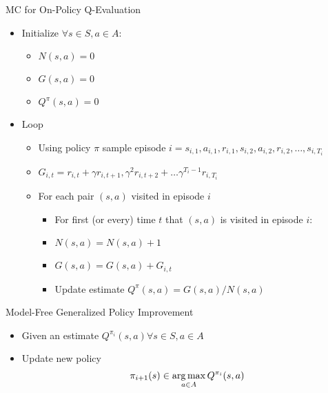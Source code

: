 \documentclass[aspectratio=169]{../latex_main/tntbeamer}  %
\begin{document}
\begin{frame}[c]{MC for On-Policy Q-Evaluation}
	
	\begin{itemize}
		\item Initialize $\forall s\in S, a\in A$:
		\begin{itemize}
			\item $N(s,a) = 0$
			\item $G(s,a) = 0$
			\item $Q^\pi(s,a) =0$
		\end{itemize}
		\item Loop
		\begin{itemize}
			\item Using policy $\pi$ sample episode $i = s_{i,1}, a_{i,1}, r_{i,1}, s_{i,2}, a_{i,2}, r_{i,2}, \ldots, s_{i, T_i}$
			\item $G_{i,t} = r_{i,t} + \gamma r_{i,t+1}, \gamma^2 r_{i,t+2} + \ldots \gamma^{T_i -1} r_{i,T_i}$
			\item For each pair $(s,a)$ visited in episode $i$
			\begin{itemize}
				\item For first (or every) time $t$ that $(s,a)$ is visited in episode $i$:
				\item $N(s,a) = N(s,a) + 1$
				\item $G(s,a) = G(s,a) + G_{i,t}$
				\item Update estimate $Q^\pi(s,a) = G(s,a) /N(s,a)$
			\end{itemize}
		\end{itemize}
	\end{itemize}
	
\end{frame}
\begin{frame}[c]{Model-Free Generalized Policy Improvement}
	
	\begin{itemize}
		\item Given an estimate $Q^{\pi_i}(s,a) \forall s\in S, a \in A$
		\item Update new policy
		$$\pi_{i+1}(s) \in \operatorname*{arg\,max}_{a \in A} Q^{\pi_i} (s,a) $$
	\end{itemize}
	
\end{frame}
\end{document}

